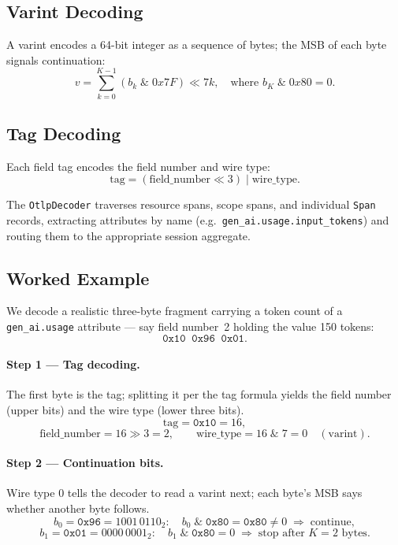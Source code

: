 \documentclass[11pt,a4paper]{article}
\begin{document}
\subsection{Varint Decoding}

A varint encodes a 64-bit integer as a sequence of bytes; the MSB of
each byte signals continuation:
\[
  v = \sum_{k=0}^{K-1} (b_k \;\&\; 0x7F) \ll 7k,
  \quad \text{where } b_K \;\&\; 0x80 = 0.
\]

\subsection{Tag Decoding}

Each field tag encodes the field number and wire type:
\[
  \text{tag} = (\text{field\_number} \ll 3) \;|\; \text{wire\_type}.
\]

The \texttt{OtlpDecoder} traverses resource spans, scope spans, and
individual \texttt{Span} records, extracting attributes by name
(e.g.\ \texttt{gen\_ai.usage.input\_tokens}) and routing them to the
appropriate session aggregate.

\subsection{Worked Example}
\label{sec:proto-example}

We decode a realistic three-byte fragment carrying a token count of a
\texttt{gen\_ai.usage} attribute --- say field number~2 holding the value
150 tokens:
\[
  \texttt{0x10}\;\; \texttt{0x96}\;\; \texttt{0x01}.
\]

\paragraph{Step 1 --- Tag decoding.}
The first byte is the tag; splitting it per the tag formula yields the
field number (upper bits) and the wire type (lower three bits).
\[
  \text{tag} = \texttt{0x10} = 16,
\]
\[
  \text{field\_number} = 16 \gg 3 = 2,
  \qquad
  \text{wire\_type} = 16 \;\&\; 7 = 0 \quad (\text{varint}).
\]

\paragraph{Step 2 --- Continuation bits.}
Wire type 0 tells the decoder to read a varint next; each byte's MSB says
whether another byte follows.
\[
  b_0 = \texttt{0x96} = 1001\,0110_2:\quad
  b_0 \;\&\; \texttt{0x80} = \texttt{0x80} \neq 0
  \;\Rightarrow\; \text{continue},
\]
\[
  b_1 = \texttt{0x01} = 0000\,0001_2:\quad
  b_1 \;\&\; \texttt{0x80} = 0
  \;\Rightarrow\; \text{stop after } K = 2 \text{ bytes}.
\]
\end{document}

